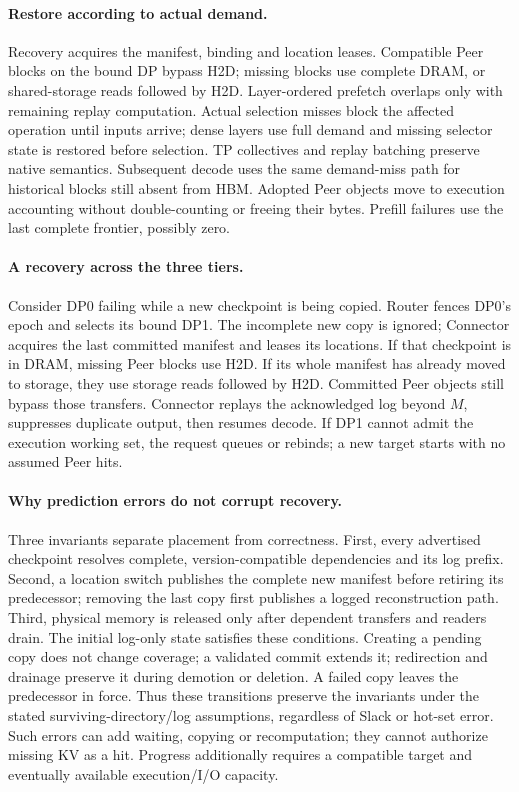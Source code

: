 \paragraph{Restore according to actual demand.}
Recovery acquires the manifest, binding and location leases. Compatible
Peer blocks on the bound DP bypass H2D; missing blocks use complete DRAM,
or shared-storage reads followed by H2D. Layer-ordered prefetch overlaps
only with remaining replay computation. Actual selection misses block
the affected operation until inputs arrive; dense layers use full demand
and missing selector state is restored before selection. TP collectives
and replay batching preserve native semantics. Subsequent decode uses the
same demand-miss path for historical blocks still absent from HBM.
Adopted Peer objects move
to execution accounting without double-counting or freeing their bytes.
Prefill failures use the last complete frontier, possibly zero.

\paragraph{A recovery across the three tiers.}
Consider DP0 failing while a new checkpoint is being copied. Router fences
DP0's epoch and selects its bound DP1. The incomplete new copy is ignored;
Connector acquires the last committed manifest and leases its locations.
If that checkpoint is in DRAM, missing Peer blocks use H2D. If its whole
manifest has already moved to storage, they use storage reads followed by
H2D. Committed Peer objects still bypass those transfers. Connector
replays the acknowledged log beyond $M$, suppresses duplicate output,
then resumes decode. If DP1 cannot admit the execution working set, the
request queues or rebinds; a new target starts with no assumed Peer hits.

\paragraph{Why prediction errors do not corrupt recovery.}
Three invariants separate placement from correctness. First, every
advertised checkpoint resolves complete, version-compatible dependencies
and its log prefix. Second, a location switch publishes the complete new
manifest before retiring its predecessor; removing the last copy first
publishes a logged reconstruction path. Third, physical memory is released
only after dependent transfers and readers drain. The initial log-only
state satisfies these conditions. Creating a pending copy does not change
coverage; a validated commit extends it; redirection and drainage preserve
it during demotion or deletion. A failed copy leaves the predecessor in
force. Thus these transitions preserve the invariants under the stated
surviving-directory/log assumptions, regardless of Slack or hot-set error.
Such errors can add waiting, copying or recomputation; they cannot authorize
missing KV as a hit. Progress additionally requires a compatible target
and eventually available execution/I/O capacity.
